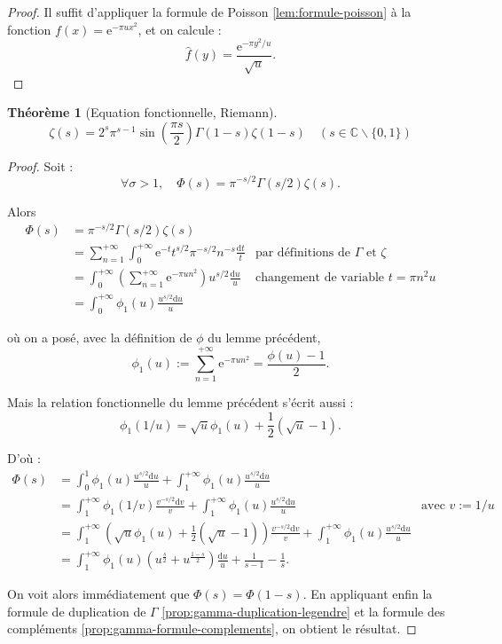 \documentclass[french]{report}
\newtheorem{theorem}{Théorème}[section]
\begin{document}
\begin{proof}
  Il suffit d'appliquer la formule de Poisson \ref{lem:formule-poisson} à la fonction $f(x)=\mathrm{e}^{-\pi ux^2}$, et on calcule :
  \[
    \hat{f}(y) = \frac{\mathrm{e}^{-\pi y^2/u}}{\sqrt{u}}.
  \]
\end{proof}

\begin{theorem}[Equation fonctionnelle, Riemann]\label{thm:equation-fonctionnelle}
  \[ \zeta(s) = 2^s\pi^{s-1}\sin\left(\frac{\pi s}{2}\right)\Gamma(1-s)\zeta(1-s)\quad (s\in\mathbb{C}\backslash\{0,1\}) \]
\end{theorem}

\begin{proof}
  Soit :
  \[
    \forall\sigma>1,\quad
    \Phi(s)=\pi^{-s/2}\Gamma(s/2)\zeta(s).
  \]

  Alors
  \begin{align*}
    \Phi(s)
    &= \pi^{-s/2}\Gamma(s/2)\zeta(s) & \\
    &= \sum_{n=1}^{+\infty}\int_0^{+\infty}\mathrm{e}^{-t}t^{s/2}\pi^{-s/2}n^{-s}\frac{\mathrm{d}t}{t}
    & \text{par définitions de $\Gamma$ et $\zeta$} \\
    &= \int_0^{+\infty}\left(\sum_{n=1}^{+\infty}\mathrm{e}^{-\pi un^2}\right)u^{s/2}\frac{\mathrm{d}u}{u}
    & \text{changement de variable $t=\pi n^2u$} \\
    &= \int_0^{+\infty}\phi_1(u)\frac{u^{s/2}\mathrm{d}u}{u}
  \end{align*}

  où on a posé, avec la définition de $\phi$ du lemme précédent,
  \[
    \phi_1(u)
    :=\sum_{n=1}^{+\infty}\mathrm{e}^{-\pi un^2}
    = \frac{\phi(u)-1}{2}.
  \]

  Mais la relation fonctionnelle du lemme précédent s'écrit aussi :
  \[
    \phi_1(1/u)=\sqrt{u}\phi_1(u)+\frac{1}{2}(\sqrt{u}-1).
  \]

  D'où :
  \begin{align*}
    \Phi(s)
    &= \int_0^1\phi_1(u)\frac{u^{s/2}\mathrm{d}u}{u} + \int_1^{+\infty}\phi_1(u)\frac{u^{s/2}\mathrm{d}u}{u}
    & \\
    &= \int_1^{+\infty}\phi_1(1/v)\frac{v^{-s/2}\mathrm{d}v}{v} + \int_1^{+\infty}\phi_1(u)\frac{u^{s/2}\mathrm{d}u}{u}
    & \text{avec $v:=1/u$} \\
    &= \int_1^{+\infty}\left(\sqrt{u}\phi_1(u)+\frac{1}{2}(\sqrt{u}-1)\right)\frac{v^{-s/2}\mathrm{d}v}{v} + \int_1^{+\infty}\phi_1(u)\frac{u^{s/2}\mathrm{d}u}{u}
    & \\
    &= \int_1^{+\infty}\phi_1(u)\left(u^{\frac{s}{2}}+u^{\frac{1-s}{2}}\right)\frac{\mathrm{d}u}{u} + \frac{1}{s-1}-\frac{1}{s}.
  \end{align*}

  On voit alors immédiatement que $\Phi(s)=\Phi(1-s)$. En appliquant enfin la formule de duplication de $\Gamma$ \ref{prop:gamma-duplication-legendre} et la formule des compléments \ref{prop:gamma-formule-complements}, on obtient le résultat.
\end{proof}
\end{document}
